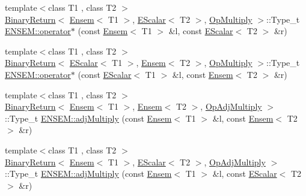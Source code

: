 \begin{DoxyCompactItemize}
\item 
{\footnotesize template$<$class T1 , class T2 $>$ }\\\mbox{\hyperlink{structENSEM_1_1BinaryReturn}{Binary\+Return}}$<$ \mbox{\hyperlink{classENSEM_1_1Ensem}{Ensem}}$<$ T1 $>$, \mbox{\hyperlink{classENSEM_1_1EScalar}{E\+Scalar}}$<$ T2 $>$, \mbox{\hyperlink{structENSEM_1_1OpMultiply}{Op\+Multiply}} $>$\+::Type\+\_\+t \mbox{\hyperlink{group__eensem_gad8e9dadde3e0114542b222f4631cc216}{E\+N\+S\+E\+M\+::operator$\ast$}} (const \mbox{\hyperlink{classENSEM_1_1Ensem}{Ensem}}$<$ T1 $>$ \&l, const \mbox{\hyperlink{classENSEM_1_1EScalar}{E\+Scalar}}$<$ T2 $>$ \&r)
\item 
{\footnotesize template$<$class T1 , class T2 $>$ }\\\mbox{\hyperlink{structENSEM_1_1BinaryReturn}{Binary\+Return}}$<$ \mbox{\hyperlink{classENSEM_1_1EScalar}{E\+Scalar}}$<$ T1 $>$, \mbox{\hyperlink{classENSEM_1_1Ensem}{Ensem}}$<$ T2 $>$, \mbox{\hyperlink{structENSEM_1_1OpMultiply}{Op\+Multiply}} $>$\+::Type\+\_\+t \mbox{\hyperlink{group__eensem_ga56ee052eb9134728080172ffe2e946af}{E\+N\+S\+E\+M\+::operator$\ast$}} (const \mbox{\hyperlink{classENSEM_1_1EScalar}{E\+Scalar}}$<$ T1 $>$ \&l, const \mbox{\hyperlink{classENSEM_1_1Ensem}{Ensem}}$<$ T2 $>$ \&r)
\item 
{\footnotesize template$<$class T1 , class T2 $>$ }\\\mbox{\hyperlink{structENSEM_1_1BinaryReturn}{Binary\+Return}}$<$ \mbox{\hyperlink{classENSEM_1_1Ensem}{Ensem}}$<$ T1 $>$, \mbox{\hyperlink{classENSEM_1_1Ensem}{Ensem}}$<$ T2 $>$, \mbox{\hyperlink{structENSEM_1_1OpAdjMultiply}{Op\+Adj\+Multiply}} $>$\+::Type\+\_\+t \mbox{\hyperlink{group__eensem_ga5f37d8984a1db92adfb04f6c0908a563}{E\+N\+S\+E\+M\+::adj\+Multiply}} (const \mbox{\hyperlink{classENSEM_1_1Ensem}{Ensem}}$<$ T1 $>$ \&l, const \mbox{\hyperlink{classENSEM_1_1Ensem}{Ensem}}$<$ T2 $>$ \&r)
\item 
{\footnotesize template$<$class T1 , class T2 $>$ }\\\mbox{\hyperlink{structENSEM_1_1BinaryReturn}{Binary\+Return}}$<$ \mbox{\hyperlink{classENSEM_1_1Ensem}{Ensem}}$<$ T1 $>$, \mbox{\hyperlink{classENSEM_1_1EScalar}{E\+Scalar}}$<$ T2 $>$, \mbox{\hyperlink{structENSEM_1_1OpAdjMultiply}{Op\+Adj\+Multiply}} $>$\+::Type\+\_\+t \mbox{\hyperlink{group__eensem_ga357579ea9af81c46ec906486ce9f2a52}{E\+N\+S\+E\+M\+::adj\+Multiply}} (const \mbox{\hyperlink{classENSEM_1_1Ensem}{Ensem}}$<$ T1 $>$ \&l, const \mbox{\hyperlink{classENSEM_1_1EScalar}{E\+Scalar}}$<$ T2 $>$ \&r)
\item 

\end{DoxyCompactItemize}
